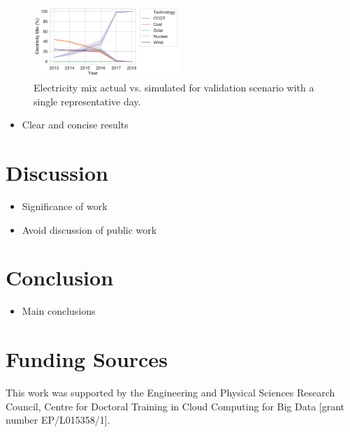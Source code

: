 \documentclass[final,3p,times,twocolumn,numbers]{elsarticle}
\begin{document}
\begin{figure}
\centering
\includegraphics[width=0.49\textwidth]{figures/results/yearly_time_step_scenario.pdf}
\caption{Electricity mix actual vs. simulated for validation scenario with a single representative day.}
\label{fig:single_time_step_results}
\end{figure}











\begin{itemize}
	\item Clear and concise results
\end{itemize}

\section{Discussion}
\label{sec:discussion}

\begin{itemize}
	\item Significance of work
	\item Avoid discussion of public work
\end{itemize}

\section{Conclusion}
\label{sec:conclusion}

\begin{itemize}
	\item Main conclusions
\end{itemize}

\section{Funding Sources}

This work was supported by the Engineering and Physical Sciences Research Council, Centre for Doctoral Training in Cloud Computing for Big Data [grant number EP/L015358/1].
\end{document}
